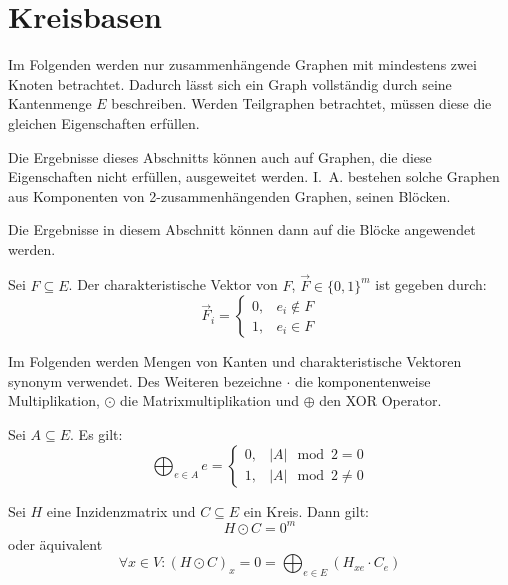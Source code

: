 \section{Kreisbasen}

Im Folgenden werden nur zusammenhängende Graphen mit mindestens zwei Knoten betrachtet.
Dadurch lässt sich ein Graph vollständig durch seine Kantenmenge $ E $ beschreiben.
Werden Teilgraphen betrachtet, müssen diese die gleichen Eigenschaften erfüllen.

\begin{remark}
    Die Ergebnisse dieses Abschnitts können auch auf Graphen, die diese Eigenschaften nicht erfüllen, ausgeweitet werden.
    I.~A. bestehen solche Graphen aus Komponenten von 2-zusammenhängenden Graphen, seinen Blöcken.

    Die Ergebnisse in diesem Abschnitt können dann auf die Blöcke angewendet werden.
\end{remark}

\begin{definition}
    Sei $ F \subseteq E $.
    Der charakteristische Vektor von $ F $, $ \vec{F} \in \{ 0, 1 \}^m $ ist gegeben durch:
    \begin{equation*}
        \vec{F}_i = \begin{cases}
            0, & e_i \notin F \\
            1, & e_i \in F
        \end{cases}
    \end{equation*}
\end{definition}

Im Folgenden werden Mengen von Kanten und charakteristische Vektoren synonym verwendet.
Des Weiteren bezeichne $ \cdot $ die komponentenweise Multiplikation, $ \odot $ die Matrixmultiplikation und $ \oplus $ den XOR Operator.

\begin{proposition}
    \label{prp:xor-odd-even}
    Sei $ A \subseteq E $.
    Es gilt:
    \begin{equation*}
        \bigoplus_{e \in A} e = \begin{cases}
            0, & |A| \mod 2 = 0 \\
            1, & |A| \mod 2 \ne 0
        \end{cases}
    \end{equation*}
\end{proposition}

\begin{proposition}
    Sei $ H $ eine Inzidenzmatrix und $ C \subseteq E $ ein Kreis.
    Dann gilt:
    \begin{equation*}
        H \odot C = 0^m
    \end{equation*}
    oder äquivalent
    \begin{equation*}
        \forall x \in V: (H \odot C)_x = 0 = \bigoplus_{e \in E} (H_{xe} \cdot C_e)
    \end{equation*}
\end{proposition}

